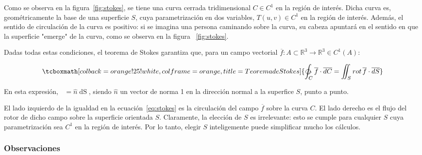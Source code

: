 \documentclass{article}
\renewcommand{\Bbb}{\mathbb}
\begin{document}
Como se observa en la figura~\ref{fig:stokes}, se tiene una curva cerrada tridimensional $C \in C^1$ en la región de interés. Dicha curva es, geométricamente la base de una superficie $S$, cuya parametrización en dos variables, $T(u,v) \in C^1$ en la región de interés. Además, el sentido de circulación de la curva  es positivo: si se imagina una persona caminando sobre la curva, su cabeza apuntará en el sentido en que la superficie "emerge" de la curva, como se observa en la figura ~\ref{fig:stokes}.

Dadas todas estas condiciones, el teorema de Stokes garantiza que, para un campo vectorial $\overline{f}: A \subset \Bbb R^3 \rightarrow \Bbb R^3 \in C^1(A)$:

\begin{equation}
\tcboxmath[colback=orange!25!white,colframe=orange, title=Teorema de Stokes]
{ \ointctrclockwise_C \overline{f} \cdot \mathop{\overline{dC}} = \iint_S \mathop{rot}\overline{f} \cdot \mathop{\overline{dS}}
 }
\label{eq:stokes}
\end{equation}

En esta expresión, $\mathop{\overline{dS}} = \hat{n} \mathop{dS}$, siendo $\hat{n}$ un vector de norma 1 en la dirección normal a la superfice $S$, punto a punto.

El lado izquierdo de la igualdad en la ecuación~\ref{eq:stokes} es la circulación del campo $\overline{f}$ sobre la curva $C$. El lado derecho es el flujo del rotor de dicho campo sobre la superficie orientada $S$. Claramente, la elección de $S$ es irrelevante: esto se cumple para cualquier $S$ cuya parametrización sea $C^1$ en la región de interés. Por lo tanto, elegir $S$ inteligemente puede simplificar mucho los cálculos.

\subsubsection{Observaciones}
\end{document}

